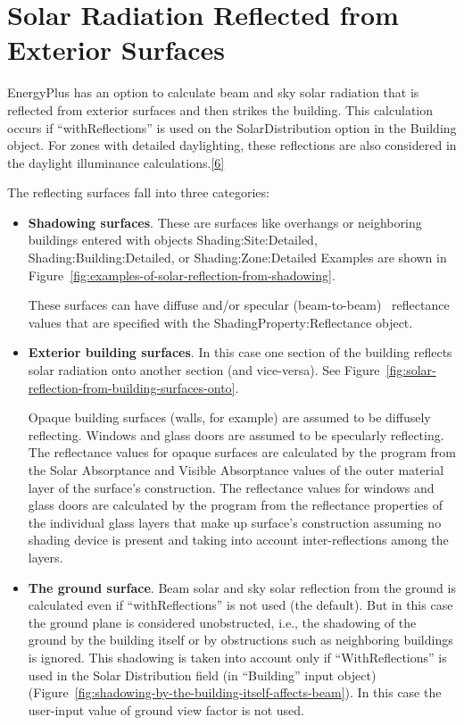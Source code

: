 \chapter{Solar Radiation Reflected from Exterior Surfaces}\label{solar-radiation-reflected-from-exterior-surfaces}

EnergyPlus has an option to calculate beam and sky solar radiation that is reflected from exterior surfaces and then strikes the building. This calculation occurs if ``withReflections'' is used on the SolarDistribution option in the Building object. For zones with detailed daylighting, these reflections are also considered in the daylight illuminance calculations.\protect\hyperlink{ux5fftn6}{{[}6{]}}

The reflecting surfaces fall into three categories:

\begin{itemize}
\item
  \textbf{Shadowing surfaces}. These are surfaces like overhangs or neighboring buildings entered with objects Shading:Site:Detailed, Shading:Building:Detailed, or Shading:Zone:Detailed Examples are shown in Figure~\ref{fig:examples-of-solar-reflection-from-shadowing}.

These surfaces can have diffuse and/or specular (beam-to-beam)~ reflectance values that are specified with the ShadingProperty:Reflectance object.

\item
  \textbf{Exterior building surfaces}. In this case one section of the building reflects solar radiation onto another section (and vice-versa). See Figure~\ref{fig:solar-reflection-from-building-surfaces-onto}.

Opaque building surfaces (walls, for example) are assumed to be diffusely reflecting. Windows and glass doors are assumed to be specularly reflecting. The reflectance values for opaque surfaces are calculated by the program from the Solar Absorptance and Visible Absorptance values of the outer material layer of the surface's construction. The reflectance values for windows and glass doors are calculated by the program from the reflectance properties of the individual glass layers that make up surface's construction assuming no shading device is present and taking into account inter-reflections among the layers.

\item
  \textbf{The ground surface}. Beam solar and sky solar reflection from the ground is calculated even if ``withReflections'' is not used (the default). But in this case the ground plane is considered unobstructed, i.e., the shadowing of the ground by the building itself or by obstructions such as neighboring buildings is ignored. This shadowing is taken into account only if ``WithReflections'' is used in the Solar Distribution field (in ``Building'' input object) (Figure~\ref{fig:shadowing-by-the-building-itself-affects-beam}). In this case the user-input value of ground view factor is not used.
\end{itemize}

